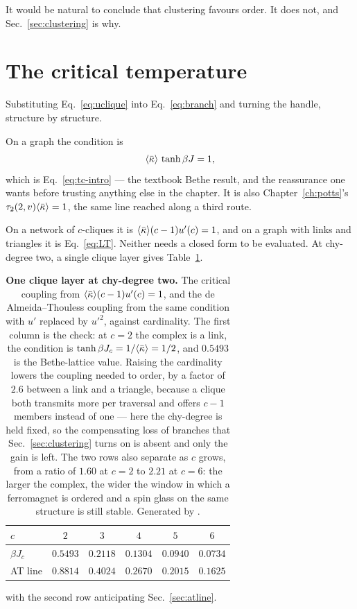 It would be natural to conclude that clustering favours order. It does not, and
Sec.~\ref{sec:clustering} is why.

\section{The critical temperature}
\label{sec:tc}

Substituting Eq.~\eqref{eq:uclique} into Eq.~\eqref{eq:branch} and turning the
handle, structure by structure.

On a graph the condition is
\begin{equation}
  \langle \bar\kappa \rangle\,\tanh\beta J=1,
  \label{eq:tcgraph}
\end{equation}
which is Eq.~\eqref{eq:tc-intro} --- the textbook Bethe result, and the
reassurance one wants before trusting anything else in the chapter. It is also
Chapter~\ref{ch:potts}'s $\tau_{2}(2,v)\langle \bar\kappa \rangle=1$, the same line reached
along a third route.

On a network of $c$-cliques it is $\langle \bar\kappa \rangle(c-1)u'(c)=1$, and on a graph
with links and triangles it is Eq.~\eqref{eq:LT}. Neither needs a closed form to
be evaluated. At chy-degree two, a single clique layer gives Table~\ref{tab:cliquetc}.
\begin{table}[t]
\centering\small
\begin{tabular}{lccccc}
\hline\hline
$c$ & $2$ & $3$ & $4$ & $5$ & $6$\\
\hline
$\beta J_{c}$ & $0.5493$ & $0.2118$ & $0.1304$ & $0.0940$ & $0.0734$\\
AT line & $0.8814$ & $0.4024$ & $0.2670$ & $0.2015$ & $0.1625$\\
\hline\hline
\end{tabular}
\caption{\textbf{One clique layer at chy-degree two.} The critical coupling from
$\langle \bar\kappa \rangle(c-1)u'(c)=1$, and the de Almeida--Thouless coupling from the same
condition with $u'$ replaced by $u'^{2}$, against cardinality. The first column
is the check: at $c=2$ the complex is a link, the condition is
$\tanh\beta J_{c}=1/\langle \bar\kappa \rangle=1/2$, and $0.5493$ is the Bethe-lattice value.
Raising the cardinality lowers the coupling needed to order, by a factor of
$2.6$ between a link and a triangle, because a clique both transmits more per
traversal and offers $c-1$ members instead of one --- here the chy-degree is
held fixed, so the compensating loss of branches that
Sec.~\ref{sec:clustering} turns on is absent and only the gain is left. The two
rows also separate as $c$ grows, from a ratio of $1.60$ at $c=2$ to $2.21$ at
$c=6$: the larger the complex, the wider the window in which a ferromagnet is
ordered and a spin glass on the same structure is still stable. Generated by
.}
\label{tab:cliquetc}
\end{table}
with the second row anticipating Sec.~\ref{sec:atline}.

